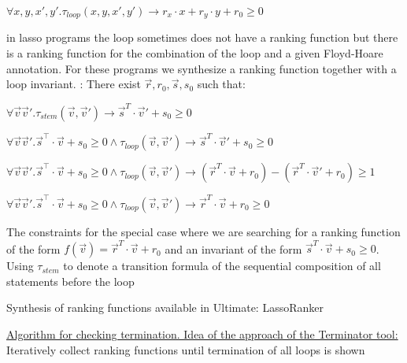 \documentclass[landscape, a4paper]{article}
\begin{document}
\begin{minipage}[t]{0.2\linewidth}
\begin{betterlist}
\begin{betterlist}
			\item $\forall x, y, x', y' . \tau_{loop}(x, y, x', y') \rightarrow r_x \cdot  x + r_y \cdot y + r_0 \geq 0$
		\end{betterlist}
		\item {}
		\item in lasso programs the loop sometimes does not have a ranking function but there is a ranking function for the combination of the loop and a given Floyd-Hoare annotation. For these programs we synthesize a ranking function together with a loop invariant. : There exist $\vec{r}, r_0, \vec{s}, s_0$ such that:
		\begin{betterlist}
			\item $\forall\vec{v}\vec{v}'.\tau_{stem}(\vec{v},\vec{v}') \rightarrow\vec{s}^T\cdot \vec{v}' + s_0 \geq 0$
			\item $\forall\vec{v}\vec{v}'.\vec{s}^⊺\cdot \vec{v} + s_0 \geq 0 \land \tau_{loop}(\vec{v},\vec{v}') \rightarrow\vec{s}^T\cdot \vec{v}' + s_0 \geq 0$
			\item $\forall\vec{v}\vec{v}'.\vec{s}^⊺\cdot \vec{v} + s_0 \geq 0 \land \tau_{loop}(\vec{v},\vec{v}') \rightarrow (\vec{r}^T\cdot \vec{v} + r_0) −(\vec{r}^T\cdot \vec{v}'  + r_0) \geq 1$
			\item $\forall\vec{v}\vec{v}'.\vec{s}^⊺\cdot \vec{v} + s_0 \geq 0 \land \tau_{loop}(\vec{v},\vec{v}') \rightarrow\vec{r}^T\cdot \vec{v} + r_0 \geq 0$
		\end{betterlist}
		\begin{betterlist}
			\item The constraints for the special case where we are searching for a ranking function of the form $f(\vec{v}) =\vec{r}^T\cdot \vec{v} + r_0$ and an invariant of the form $\vec{s}^T\cdot \vec{v} + s_0 \geq 0$. Using $\tau_{stem}$ to denote a transition formula of the sequential composition of all statements before the loop
		\end{betterlist}
		\item Synthesis of ranking functions available in Ultimate: \alert{LassoRanker}
	\end{betterlist}
	\begin{betterlist}
		\item \underline{Algorithm for checking termination. Idea of the approach of the Terminator tool:} Iteratively collect ranking functions until termination of all loops is shown
		\begin{enumerate}

\end{enumerate}
\end{betterlist}
\end{minipage}
\end{document}
